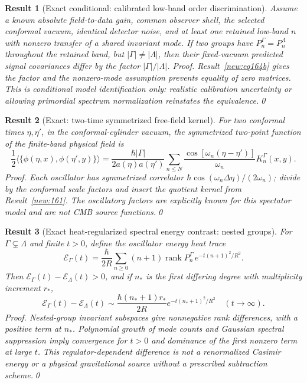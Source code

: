 \documentclass[aps,prd,onecolumn,notitlepage,groupedaddress,11pt]{revtex4-2}
\newtheorem{result}{Result}
\begin{document}
\begin{result}[\textsf{Exact conditional}: calibrated low-band order discrimination]\label{new:172}
Assume a known absolute field-to-data gain, common observer shell, the selected conformal vacuum, identical detector noise, and at least one retained low-band $n$ with nonzero transfer of a shared invariant mode. If two groups have $P_n^\Gamma=P_n^\Lambda$ throughout the retained band, but $|\Gamma|\ne|\Lambda|$, then their fixed-vacuum predicted signal covariances differ by the factor $|\Gamma|/|\Lambda|$.
\textit{Proof.} Result~\ref{new:eq164b} gives the factor and the nonzero-mode assumption prevents equality of zero matrices. This is conditional model identification \emph{only}: realistic calibration uncertainty or allowing primordial spectrum normalization reinstates the equivalence.\qed
\end{result}

\begin{result}[\textsf{Exact}: two-time symmetrized free-field kernel]\label{new:173}
For two conformal times $\eta,\eta'$, in the conformal-cylinder vacuum, the symmetrized two-point function of the finite-band physical field is
\begin{equation}\label{new:eq173}
 \frac12\langle\{\phi(\eta,x),\phi(\eta',y)\}\rangle
 =\frac{\hbar|\Gamma|}{2a(\eta)a(\eta')}\sum_{n\le N}\frac{\cos[\omega_n(\eta-\eta')]}{\omega_n}K_n^\Gamma(x,y).
\end{equation}
\textit{Proof.} Each oscillator has symmetrized correlator $\hbar\cos(\omega_n\Delta\eta)/(2\omega_n)$; divide by the conformal scale factors and insert the quotient kernel from Result~\ref{new:161}. The oscillatory factors are explicitly known for this spectator model and are not CMB source functions.\qed
\end{result}

\begin{result}[\textsf{Exact heat-regularized spectral energy contrast}: nested groups]\label{new:174}
For $\Gamma\subsetneq\Lambda$ and finite $t>0$, define the oscillator energy heat trace
\begin{equation}\label{new:eq174}
 \mathcal E_\Gamma(t)=\frac{\hbar}{2R}\sum_{n\ge0}(n+1)\operatorname{rank}P_n^\Gamma \, e^{-t(n+1)^2/R^2}.
\end{equation}
Then $\mathcal E_\Gamma(t)-\mathcal E_\Lambda(t)>0$, and if $n_*$ is the first differing degree with multiplicity increment $r_*$,
\begin{equation}\label{new:eq174b}
 \mathcal E_\Gamma(t)-\mathcal E_\Lambda(t)\sim\frac{\hbar(n_*+1)r_*}{2R} e^{-t(n_*+1)^2/R^2}\quad(t\to\infty).
\end{equation}
\textit{Proof.} Nested-group invariant subspaces give nonnegative rank differences, with a positive term at $n_*$. Polynomial growth of mode counts and Gaussian spectral suppression imply convergence for $t>0$ and dominance of the first nonzero term at large $t$. This regulator-dependent difference is \emph{not} a renormalized Casimir energy or a physical gravitational source without a prescribed subtraction scheme.\qed
\end{result}
\end{document}
